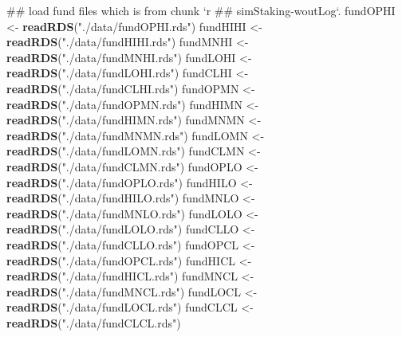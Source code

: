 \documentclass[]{tufte-book}
\newenvironment{Shaded}{}{}
\newcommand{\KeywordTok}[1]{\textcolor[rgb]{0.00,0.44,0.13}{\textbf{#1}}}
\newcommand{\StringTok}[1]{\textcolor[rgb]{0.25,0.44,0.63}{#1}}
\newcommand{\NormalTok}[1]{#1}
\begin{document}
\begin{Shaded}
\begin{Highlighting}[]
{\NormalTok{## load fund files which is from chunk `r}
\NormalTok{## simStaking-woutLog`.}
\NormalTok{fundOPHI <-}\StringTok{ }\KeywordTok{readRDS}\NormalTok{(}\StringTok{"./data/fundOPHI.rds"}\NormalTok{)}
\NormalTok{fundHIHI <-}\StringTok{ }\KeywordTok{readRDS}\NormalTok{(}\StringTok{"./data/fundHIHI.rds"}\NormalTok{)}
\NormalTok{fundMNHI <-}\StringTok{ }\KeywordTok{readRDS}\NormalTok{(}\StringTok{"./data/fundMNHI.rds"}\NormalTok{)}
\NormalTok{fundLOHI <-}\StringTok{ }\KeywordTok{readRDS}\NormalTok{(}\StringTok{"./data/fundLOHI.rds"}\NormalTok{)}
\NormalTok{fundCLHI <-}\StringTok{ }\KeywordTok{readRDS}\NormalTok{(}\StringTok{"./data/fundCLHI.rds"}\NormalTok{)}
\NormalTok{fundOPMN <-}\StringTok{ }\KeywordTok{readRDS}\NormalTok{(}\StringTok{"./data/fundOPMN.rds"}\NormalTok{)}
\NormalTok{fundHIMN <-}\StringTok{ }\KeywordTok{readRDS}\NormalTok{(}\StringTok{"./data/fundHIMN.rds"}\NormalTok{)}
\NormalTok{fundMNMN <-}\StringTok{ }\KeywordTok{readRDS}\NormalTok{(}\StringTok{"./data/fundMNMN.rds"}\NormalTok{)}
\NormalTok{fundLOMN <-}\StringTok{ }\KeywordTok{readRDS}\NormalTok{(}\StringTok{"./data/fundLOMN.rds"}\NormalTok{)}
\NormalTok{fundCLMN <-}\StringTok{ }\KeywordTok{readRDS}\NormalTok{(}\StringTok{"./data/fundCLMN.rds"}\NormalTok{)}
\NormalTok{fundOPLO <-}\StringTok{ }\KeywordTok{readRDS}\NormalTok{(}\StringTok{"./data/fundOPLO.rds"}\NormalTok{)}
\NormalTok{fundHILO <-}\StringTok{ }\KeywordTok{readRDS}\NormalTok{(}\StringTok{"./data/fundHILO.rds"}\NormalTok{)}
\NormalTok{fundMNLO <-}\StringTok{ }\KeywordTok{readRDS}\NormalTok{(}\StringTok{"./data/fundMNLO.rds"}\NormalTok{)}
\NormalTok{fundLOLO <-}\StringTok{ }\KeywordTok{readRDS}\NormalTok{(}\StringTok{"./data/fundLOLO.rds"}\NormalTok{)}
\NormalTok{fundCLLO <-}\StringTok{ }\KeywordTok{readRDS}\NormalTok{(}\StringTok{"./data/fundCLLO.rds"}\NormalTok{)}
\NormalTok{fundOPCL <-}\StringTok{ }\KeywordTok{readRDS}\NormalTok{(}\StringTok{"./data/fundOPCL.rds"}\NormalTok{)}
\NormalTok{fundHICL <-}\StringTok{ }\KeywordTok{readRDS}\NormalTok{(}\StringTok{"./data/fundHICL.rds"}\NormalTok{)}
\NormalTok{fundMNCL <-}\StringTok{ }\KeywordTok{readRDS}\NormalTok{(}\StringTok{"./data/fundMNCL.rds"}\NormalTok{)}
\NormalTok{fundLOCL <-}\StringTok{ }\KeywordTok{readRDS}\NormalTok{(}\StringTok{"./data/fundLOCL.rds"}\NormalTok{)}
\NormalTok{fundCLCL <-}\StringTok{ }\KeywordTok{readRDS}\NormalTok{(}\StringTok{"./data/fundCLCL.rds"}\NormalTok{)}

}
\end{Highlighting}
\end{Shaded}
\end{document}
